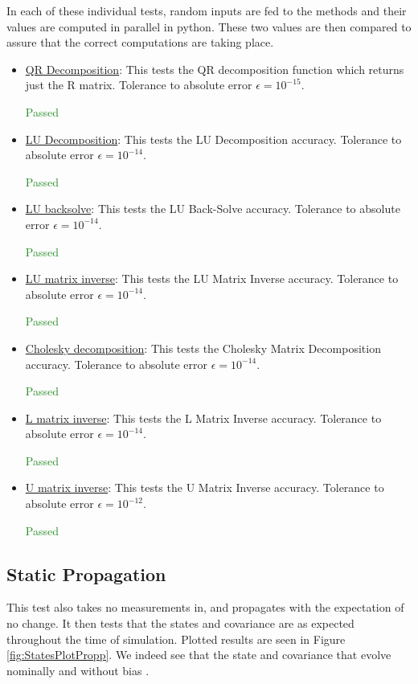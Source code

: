 \documentclass[]{BasiliskReportMemo}
\begin{document}
In each of these individual tests, random inputs are fed to the methods and their values are computed in parallel in python. These two values are then compared to assure that the correct computations are taking place. 
\begin{itemize}
\item \underline{QR Decomposition}: This tests the QR decomposition function which returns just the R matrix. Tolerance to absolute error $\epsilon = 10^{-15}$.

\textcolor{ForestGreen}{Passed}
\item \underline{LU Decomposition}: This tests the LU Decomposition accuracy. Tolerance to absolute error $\epsilon = 10^{-14}$.

\textcolor{ForestGreen}{Passed}
\item \underline{LU backsolve}: This tests the LU Back-Solve accuracy. Tolerance to absolute error $\epsilon = 10^{-14}$.

\textcolor{ForestGreen}{Passed}
\item \underline{LU matrix inverse}: This tests the LU Matrix Inverse accuracy. Tolerance to absolute error $\epsilon = 10^{-14}$.

\textcolor{ForestGreen}{Passed}
\item \underline{Cholesky decomposition}: This tests the Cholesky Matrix Decomposition accuracy. Tolerance to absolute error $\epsilon = 10^{-14}$.

\textcolor{ForestGreen}{Passed}
\item \underline{L matrix inverse}: This tests the L Matrix Inverse accuracy. Tolerance to absolute error $\epsilon = 10^{-14}$.

\textcolor{ForestGreen}{Passed}

\item \underline{U matrix inverse}: This tests the U Matrix Inverse accuracy. Tolerance to absolute error $\epsilon = 10^{-12}$.

\textcolor{ForestGreen}{Passed}
\end{itemize}

\subsection{Static Propagation}




This test also takes no measurements in, and propagates with the expectation of no change. It then tests that the states and covariance are as expected throughout the time of simulation. Plotted results are seen in Figure \ref{fig:StatesPlotPropp}. We indeed see that the state and covariance that evolve nominally and without bias .
\end{document}
